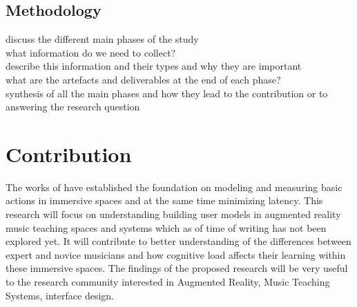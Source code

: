 \documentclass{article}
\begin{document}
\subsection{Methodology}
discuss the different main phases of the study\\
what information do we need to collect?\\
describe this information and their types and why they are important\\
what are the artefacts and deliverables at the end of each phase?\\
synthesis of all the main phases and how they lead to the contribution or to answering the research question\\
\section{Contribution}
The works of \cite{liao2020button, lee2019geometrically} have established the foundation on modeling and measuring basic actions in immersive spaces and at the same time minimizing latency. This research will focus on understanding building user models in augmented reality music teaching spaces and systems which as of time of writing has not been explored yet. It will contribute to better understanding of the differences between expert and novice musicians and how cognitive load affects their learning within these immersive spaces. The findings of the proposed research will be very useful to the research community interested in Augmented Reality, Music Teaching Systems, interface design. 




\end{document}
